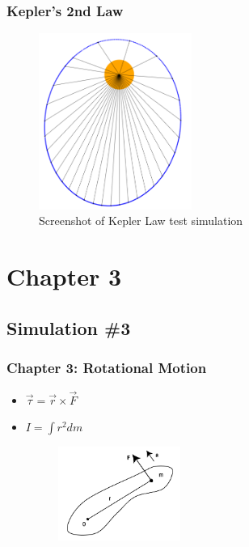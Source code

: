 \documentclass{beamer}
\begin{document}
\begin{frame}
\frametitle{Kepler's 2nd Law}

\begin{figure}[h] 
	\centering
		\includegraphics[width=5cm]{keplerscreenshot.png}

			\caption{Screenshot of Kepler Law test simulation}


	\label{fig:rigidbody}
\end{figure}

\end{frame}


\section{Chapter 3}
\subsection{Simulation \#3}

\begin{frame}

\frametitle{Chapter 3: Rotational Motion}

\begin{itemize}

\item $
\vec{\tau} = \vec{r} \times \vec{F}
$

\item $
I =   \int  r^2 dm
$








\begin{figure}[h] 
	\centering
		\includegraphics[width=4cm]{rigidbody.png}

	\label{fig:rigidbody}
\end{figure}

\end{itemize}

\end{frame}
\end{document}
